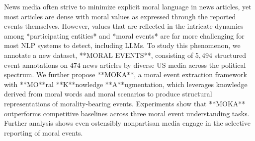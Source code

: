 News media often strive to minimize explicit moral language in news articles, yet most articles are dense with moral values as expressed through the reported events themselves. However, values that are reflected in the intricate dynamics among *participating entities* and *moral events* are far more challenging for most NLP systems to detect, including LLMs. To study this phenomenon, we annotate a new dataset, **MORAL EVENTS**, consisting of $5,494$ structured event annotations on $474$ news articles by diverse US media across the political spectrum. We further propose **MOKA**, a moral event extraction framework with **MO**ral **K**nowledge **A**ugmentation, which leverages knowledge derived from moral words and moral scenarios to produce structural representations of morality-bearing events. Experiments show that **MOKA** outperforms competitive baselines across three moral event understanding tasks. Further analysis shows even ostensibly nonpartisan media engage in the selective reporting of moral events.